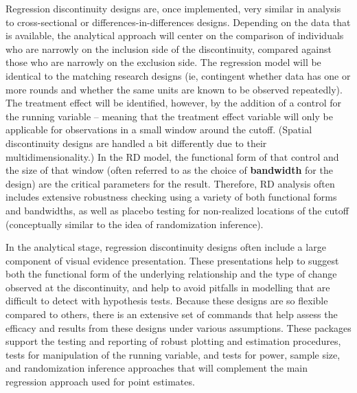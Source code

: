 Regression discontinuity designs are, once implemented,
very similar in analysis to cross-sectional or differences-in-differences designs.
Depending on the data that is available,
the analytical approach will center on the comparison of individuals
who are narrowly on the inclusion side of the discontinuity,
compared against those who are narrowly on the exclusion side.
The regression model will be identical to the matching research designs
(ie, contingent whether data has one or more rounds
and whether the same units are known to be observed repeatedly).
The treatment effect will be identified, however, by the addition of a control
for the running variable -- meaning that the treatment effect variable
will only be applicable for observations in a small window around the cutoff.
(Spatial discontinuity designs are handled a bit differently due to their multidimensionality.)
In the RD model, the functional form of that control and the size of that window
(often referred to as the choice of \textbf{bandwidth} for the design)
are the critical parameters for the result.\cite{calonico2019regression}
Therefore, RD analysis often includes extensive robustness checking
using a variety of both functional forms and bandwidths,
as well as placebo testing for non-realized locations of the cutoff
(conceptually similar to the idea of randomization inference).

In the analytical stage, regression discontinuity designs
often include a large component of visual evidence presentation.
These presentations help to suggest both the functional form
of the underlying relationship and the type of change observed at the discontinuity,
and help to avoid pitfalls in modelling that are difficult to detect with hypothesis tests.
Because these designs are so flexible compared to others,
there is an extensive set of commands that help assess
the efficacy and results from these designs under various assumptions.
These packages support the testing and reporting
of robust plotting and estimation procedures,
tests for manipulation of the running variable,
and tests for power, sample size, and randomization inference approaches
that will complement the main regression approach used for point estimates.

